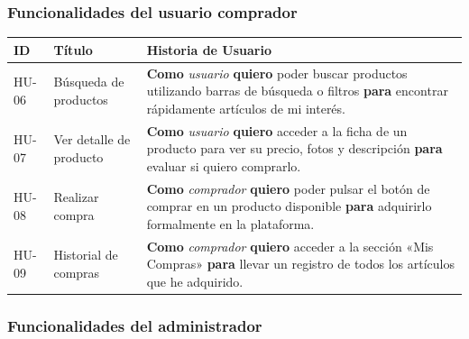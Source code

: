 \documentclass[11pt]{article}
\begin{document}
      \subsubsection{Funcionalidades del usuario comprador}
          \begin{table}[H]
              \centering
              \begin{tabularx}{\textwidth}{|l|p{3.5cm}|X|}
                  \hline
                  \textbf{ID} & \textbf{Título}         & \textbf{Historia de Usuario}                                                                                                                                               \\ \hline
                  HU-06       & Búsqueda de productos   & \textbf{Como} \textit{usuario} \textbf{quiero} poder buscar productos utilizando barras de búsqueda o filtros \textbf{para} encontrar rápidamente artículos de mi interés. \\ \hline
                  HU-07       & Ver detalle de producto & \textbf{Como} \textit{usuario} \textbf{quiero} acceder a la ficha de un producto para ver su precio, fotos y descripción \textbf{para} evaluar si quiero comprarlo.        \\ \hline
                  HU-08       & Realizar compra         & \textbf{Como} \textit{comprador} \textbf{quiero} poder pulsar el botón de comprar en un producto disponible \textbf{para} adquirirlo formalmente en la plataforma.         \\ \hline
                  HU-09       & Historial de compras    & \textbf{Como} \textit{comprador} \textbf{quiero} acceder a la sección «Mis Compras» \textbf{para} llevar un registro de todos los artículos que he adquirido.              \\ \hline
              \end{tabularx}
          \end{table}

      \subsubsection{Funcionalidades del administrador}
\end{document}
